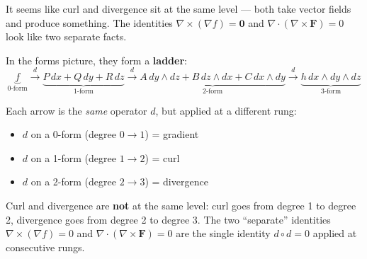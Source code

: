 \documentclass[11pt]{report}
\begin{document}
It seems like curl and divergence sit at the same level --- both take vector fields and produce something. The identities $\nabla \times (\nabla f) = \mathbf{0}$ and $\nabla \cdot (\nabla \times \mathbf{F}) = 0$ look like two separate facts.

In the forms picture, they form a \textbf{ladder}:
\[
\underbrace{f}_{\text{0-form}} \xrightarrow{\;d\;} \underbrace{P\,dx + Q\,dy + R\,dz}_{\text{1-form}} \xrightarrow{\;d\;} \underbrace{A\,dy \wedge dz + B\,dz \wedge dx + C\,dx \wedge dy}_{\text{2-form}} \xrightarrow{\;d\;} \underbrace{h\,dx \wedge dy \wedge dz}_{\text{3-form}}
\]

Each arrow is the \textit{same} operator $d$, but applied at a different rung:
\begin{itemize}
    \item $d$ on a 0-form (degree $0 \to 1$) = gradient
    \item $d$ on a 1-form (degree $1 \to 2$) = curl
    \item $d$ on a 2-form (degree $2 \to 3$) = divergence
\end{itemize}

Curl and divergence are \textbf{not} at the same level: curl goes from degree 1 to degree 2, divergence goes from degree 2 to degree 3. The two ``separate'' identities $\nabla \times (\nabla f) = 0$ and $\nabla \cdot (\nabla \times \mathbf{F}) = 0$ are the single identity $d \circ d = 0$ applied at consecutive rungs.
\end{document}

